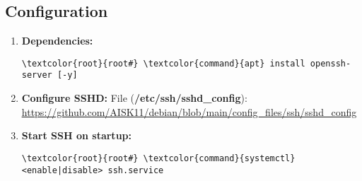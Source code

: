 \documentclass[10pt, a4paper, onecolumn, openany]{book} %
\begin{document}
\subsection{Configuration}
\begin{enumerate}
    \item \textbf{Dependencies:}
\begin{Verbatim}[commandchars=\\\{\}]
\textcolor{root}{root#} \textcolor{command}{apt} install openssh-server [-y]
\end{Verbatim}
    \item \textbf{Configure SSHD:}
    \newline File (\textbf{\textcolor{file}{/etc/ssh/sshd\_config}}):
\newline \underline{\url{https://github.com/AISK11/debian/blob/main/config_files/ssh/sshd_config}}
    \item \textbf{Start SSH on startup:}
\begin{Verbatim}[commandchars=\\\{\}]
\textcolor{root}{root#} \textcolor{command}{systemctl} <enable|disable> ssh.service
\end{Verbatim}
\end{enumerate}
\end{document}

